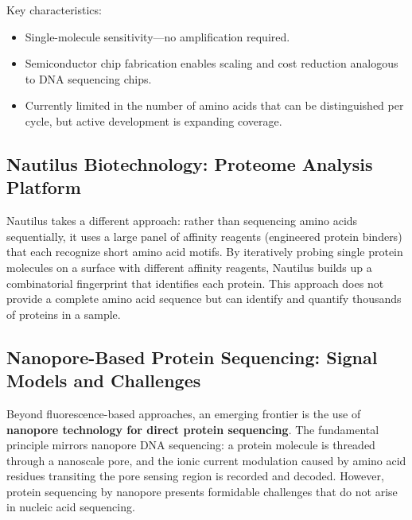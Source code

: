 Key characteristics:
\begin{itemize}[itemsep=2pt]
  \item Single-molecule sensitivity---no amplification required.
  \item Semiconductor chip fabrication enables scaling and cost reduction analogous to DNA sequencing chips.
  \item Currently limited in the number of amino acids that can be distinguished per cycle, but active development is expanding coverage.
\end{itemize}

\subsection{Nautilus Biotechnology: Proteome Analysis Platform}
\label{subsec:emerging:nautilus}

Nautilus takes a different approach: rather than sequencing amino acids sequentially, it uses a large panel of affinity reagents (engineered protein binders) that each recognize short amino acid motifs. By iteratively probing single protein molecules on a surface with different affinity reagents, Nautilus builds up a combinatorial fingerprint that identifies each protein. This approach does not provide a complete amino acid sequence but can identify and quantify thousands of proteins in a sample.

\subsection{Nanopore-Based Protein Sequencing: Signal Models and Challenges}
\label{subsec:emerging:nanopore-protein}

Beyond fluorescence-based approaches, an emerging frontier is the use of \textbf{nanopore technology for direct protein sequencing}. The fundamental principle mirrors nanopore DNA sequencing: a protein molecule is threaded through a nanoscale pore, and the ionic current modulation caused by amino acid residues transiting the pore sensing region is recorded and decoded. However, protein sequencing by nanopore presents formidable challenges that do not arise in nucleic acid sequencing.

